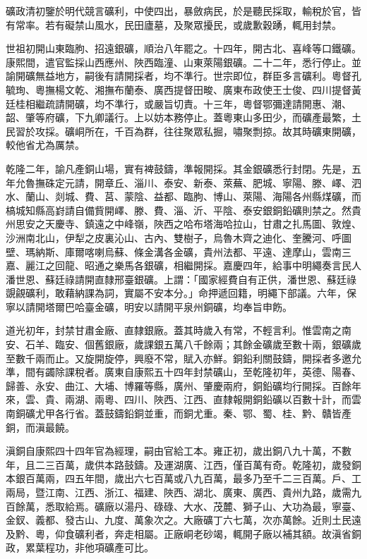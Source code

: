 \begin{pinyinscope}
礦政清初鑒於明代競言礦利，中使四出，暴斂病民，於是聽民採取，輸稅於官，皆有常率。若有礙禁山風水，民田廬墓，及聚眾擾民，或歲歉穀踴，輒用封禁。

世祖初開山東臨朐、招遠銀礦，順治八年罷之。十四年，開古北、喜峰等口鐵礦。康熙間，遣官監採山西應州、陜西臨潼、山東萊陽銀礦。二十二年，悉行停止。並諭開礦無益地方，嗣後有請開採者，均不準行。世宗即位，群臣多言礦利。粵督孔毓珣、粵撫楊文乾、湘撫布蘭泰、廣西提督田畯、廣東布政使王士俊、四川提督黃廷桂相繼疏請開礦，均不準行，或嚴旨切責。十三年，粵督鄂彌達請開惠、潮、韶、肇等府礦，下九卿議行。上以妨本務停止。蓋粵東山多田少，而礦產最繁，土民習於攻採。礦峒所在，千百為群，往往聚眾私掘，嘯聚剽掠。故其時礦東開礦，較他省尤為厲禁。

乾隆二年，諭凡產銅山場，實有裨鼓鑄，準報開採。其金銀礦悉行封閉。先是，五年允魯撫硃定元請，開章丘、淄川、泰安、新泰、萊蕪、肥城、寧陽、滕、嶧、泗水、蘭山、剡城、費、莒、蒙陰、益都、臨朐、博山、萊陽、海陽各州縣煤礦，而槁城知縣高崶請自備貲開嶧、滕、費、淄、沂、平陰、泰安銀銅鉛礦則禁之。然貴州思安之天慶寺、鎮遠之中峰嶺，陜西之哈布塔海哈拉山，甘肅之扎馬圖、敦煌、沙洲南北山，伊犁之皮裏沁山、古內、雙樹子，烏魯木齊之迪化、奎騰河、呼圖壁、瑪納斯、庫爾喀喇烏蘇、條金溝各金礦，貴州法都、平遠、達摩山，雲南三嘉、麗江之回龍、昭通之樂馬各銀礦，相繼開採。嘉慶四年，給事中明繩奏言民人潘世恩、蘇廷祿請開直隸邢臺銀礦。上謂：「國家經費自有正供，潘世恩、蘇廷祿覬覦礦利，敢藉納課為詞，實屬不安本分。」命押遞回籍，明繩下部議。六年，保寧以請開塔爾巴哈臺金礦，明安以請開平泉州銅礦，均奉旨申飭。

道光初年，封禁甘肅金廠、直隸銀廠。蓋其時歲入有常，不輕言利。惟雲南之南安、石羊、臨安、個舊銀廠，歲課銀五萬八千餘兩；其餘金礦歲至數十兩，銀礦歲至數千兩而止。又旋開旋停，興廢不常，賦入亦鮮。銅鉛利關鼓鑄，開採者多邀允準，間有蠲除課稅者。廣東自康熙五十四年封禁礦山，至乾隆初年，英德、陽春、歸善、永安、曲江、大埔、博羅等縣，廣州、肇慶兩府，銅鉛礦均行開採。百餘年來，雲、貴、兩湖、兩粵、四川、陜西、江西、直隸報開銅鉛礦以百數十計，而雲南銅礦尤甲各行省。蓋鼓鑄鉛銅並重，而銅尤重。秦、鄂、蜀、桂、黔、贛皆產銅，而滇最饒。

滇銅自康熙四十四年官為經理，嗣由官給工本。雍正初，歲出銅八九十萬，不數年，且二三百萬，歲供本路鼓鑄。及運湖廣、江西，僅百萬有奇。乾隆初，歲發銅本銀百萬兩，四五年間，歲出六七百萬或八九百萬，最多乃至千二三百萬。戶、工兩局，暨江南、江西、浙江、福建、陜西、湖北、廣東、廣西、貴州九路，歲需九百餘萬，悉取給焉。礦廠以湯丹、碌碌、大水、茂麓、獅子山、大功為最，寧臺、金釵、義都、發古山、九度、萬象次之。大廠礦丁六七萬，次亦萬餘。近則土民遠及黔、粵，仰食礦利者，奔走相屬。正廠峒老砂竭，輒開子廠以補其額。故滇省銅政，累葉程功，非他項礦產可比。


\end{pinyinscope}
